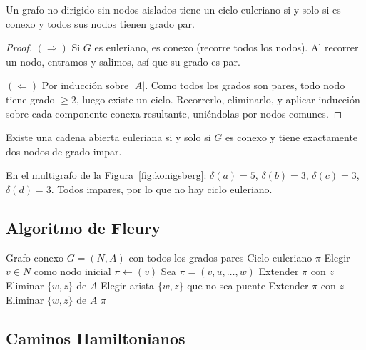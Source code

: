 \begin{teorema}[Euler]
Un grafo no dirigido sin nodos aislados tiene un ciclo euleriano si y solo si es conexo y todos sus nodos tienen grado par.
\end{teorema}
\begin{proof}
$(\Rightarrow)$ Si $G$ es euleriano, es conexo (recorre todos los nodos). Al recorrer un nodo, entramos y salimos, así que su grado es par.

$(\Leftarrow)$ Por inducción sobre $|A|$. Como todos los grados son pares, todo nodo tiene grado $\geq 2$, luego existe un ciclo. Recorrerlo, eliminarlo, y aplicar inducción sobre cada componente conexa resultante, uniéndolas por nodos comunes.
\end{proof}

\begin{corolario}
Existe una cadena abierta euleriana si y solo si $G$ es conexo y tiene exactamente dos nodos de grado impar.
\end{corolario}

\begin{ejemplo}[Königsberg]
En el multigrafo de la Figura~\ref{fig:konigsberg}: $\delta(a) = 5$, $\delta(b) = 3$, $\delta(c) = 3$, $\delta(d) = 3$. Todos impares, por lo que no hay ciclo euleriano.
\end{ejemplo}

\subsection{Algoritmo de Fleury}

\begin{algorithm}[htbp]
\caption{Algoritmo de Fleury}
\begin{algorithmic}[1]
\Require Grafo conexo $G = (N, A)$ con todos los grados pares
\Ensure Ciclo euleriano $\pi$
\State Elegir $v \in N$ como nodo inicial
\State $\pi \gets (v)$
  \State Sea $\pi = (v, u, \ldots, w)$
    \State Extender $\pi$ con $z$
    \State Eliminar $\{w,z\}$ de $A$
  \Else
    \State Elegir arista $\{w,z\}$ que no sea puente
    \State Extender $\pi$ con $z$
    \State Eliminar $\{w,z\}$ de $A$
  \EndIf
\EndWhile
\State \Return $\pi$
\end{algorithmic}
\end{algorithm}

\subsection{Caminos Hamiltonianos}

